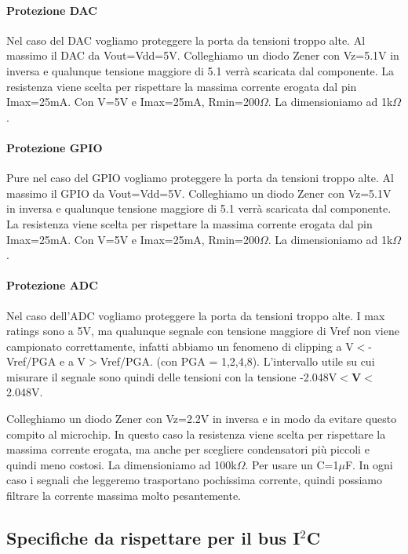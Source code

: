 \documentclass[10pt]{article}
\begin{document}
			\paragraph{Protezione DAC}
				Nel caso del DAC vogliamo proteggere la porta da tensioni troppo alte. Al massimo il DAC da Vout=Vdd=5V. Colleghiamo un diodo Zener con Vz=5.1V in inversa e qualunque tensione maggiore di 5.1 verrà scaricata dal componente.
				La resistenza viene scelta per rispettare la massima corrente erogata dal pin Imax=25mA. Con V=5V e Imax=25mA, Rmin=200\(\Omega\). La dimensioniamo ad 1k\(\Omega\).
			\paragraph{Protezione GPIO}
				Pure nel caso del GPIO vogliamo proteggere la porta da tensioni troppo alte. Al massimo il GPIO da Vout=Vdd=5V. Colleghiamo un diodo Zener con Vz=5.1V in inversa e qualunque tensione maggiore di 5.1 verrà scaricata dal componente.
				La resistenza viene scelta per rispettare la massima corrente erogata dal pin Imax=25mA. Con V=5V e Imax=25mA, Rmin=200\(\Omega\). La dimensioniamo ad 1k\(\Omega\).
			\paragraph{Protezione ADC}
				Nel caso dell'ADC vogliamo proteggere la porta da tensioni troppo alte. I max ratings sono a 5V, ma qualunque segnale con tensione maggiore di Vref non viene campionato correttamente,
				infatti abbiamo un fenomeno di clipping a V\(<\)-Vref/PGA e a V\(>\)Vref/PGA. (con PGA = 1,2,4,8).
				L'intervallo utile su cui misurare il segnale sono quindi delle tensioni con la tensione -2.048V\(<\)\textbf{V}\(<\)2.048V.
				
				Colleghiamo un diodo Zener con Vz=2.2V in inversa e in modo da evitare questo compito al microchip.
				In questo caso la resistenza viene scelta per rispettare la massima corrente erogata, ma anche per scegliere condensatori più piccoli e quindi meno costosi.
				La dimensioniamo ad 100k\(\Omega\). Per usare un C=1\(\mu\)F. In ogni caso i segnali che leggeremo trasportano pochissima corrente, quindi possiamo filtrare la corrente massima molto pesantemente.


	\subsection{Specifiche da rispettare per il bus I\(^2\)C}
\end{document}
